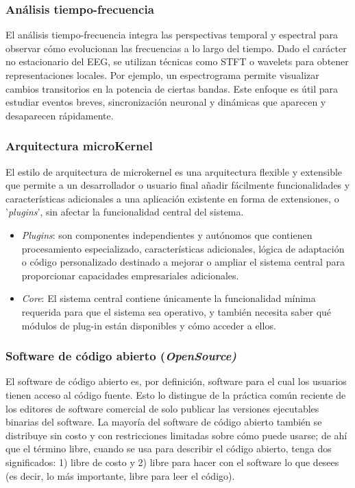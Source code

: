 \documentclass[12pt,letterpaper]{article}
\begin{document}
\subsubsection{Análisis tiempo-frecuencia}

El análisis tiempo-frecuencia integra las perspectivas temporal y espectral para observar cómo evolucionan las frecuencias a lo largo del tiempo. Dado el carácter no estacionario del EEG, se utilizan técnicas como STFT o wavelets para obtener representaciones locales. Por ejemplo, un espectrograma permite visualizar cambios transitorios en la potencia de ciertas bandas. Este enfoque es útil para estudiar eventos breves, sincronización neuronal y dinámicas que aparecen y desaparecen rápidamente.

\subsubsection{Arquitectura microKernel}
El estilo de arquitectura de microkernel es una arquitectura flexible y extensible que permite a un desarrollador o usuario final añadir fácilmente funcionalidades y características adicionales a una aplicación existente en forma de extensiones, o '\textit{plugins}', sin afectar la funcionalidad central del sistema.
\cite{noauthor_software_nodate}

\begin{itemize}
    \item \textit{Plugins}: son componentes independientes y autónomos que contienen procesamiento especializado, características adicionales, lógica de adaptación o código personalizado destinado a mejorar o ampliar el sistema central para proporcionar capacidades empresariales adicionales.\cite{noauthor_software_nodate}
    \item\textit{Core}: El sistema central contiene únicamente la funcionalidad mínima requerida para que el sistema sea operativo, y también necesita saber qué módulos de plug-in están disponibles y cómo acceder a ellos.\cite{noauthor_software_nodate}
\end{itemize}

\subsubsection{Software de código abierto (\textit{OpenSource)}}
El software de código abierto es, por definición, software para el cual los usuarios tienen acceso al código fuente. Esto lo distingue de la práctica común reciente de los editores de software comercial de solo publicar las versiones ejecutables binarias del software. La mayoría del software de código abierto también se distribuye sin costo y con restricciones limitadas sobre cómo puede usarse; de ahí que el término libre, cuando se usa para describir el código abierto, tenga dos significados: 1) libre de costo y 2) libre para hacer con el software lo que desees (es decir, lo más importante, libre para leer el código). \cite{noauthor_association_nodate}
\end{document}
